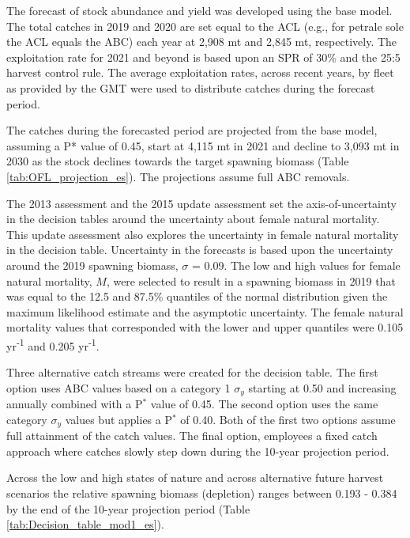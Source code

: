 \documentclass[12pt,]{article}
\begin{document}
The forecast of stock abundance and yield was developed using the base
model. The total catches in 2019 and 2020 are set equal to the ACL
(e.g., for petrale sole the ACL equals the ABC) each year at 2,908 mt
and 2,845 mt, respectively. The exploitation rate for 2021 and beyond is
based upon an SPR of 30\% and the 25:5 harvest control rule. The average
exploitation rates, across recent years, by fleet as provided by the GMT
were used to distribute catches during the forecast period.

The catches during the forecasted period are projected from the base
model, assuming a P* value of 0.45, start at 4,115 mt in 2021 and
decline to 3,093 mt in 2030 as the stock declines towards the target
spawning biomass (Table \ref{tab:OFL_projection_es}). The projections
assume full ABC removals.

The 2013 assessment and the 2015 update assessment set the
axis-of-uncertainty in the decision tables around the uncertainty about
female natural mortality. This update assessment also explores the
uncertainty in female natural mortality in the decision table.
Uncertainty in the forecasts is based upon the uncertainty around the
2019 spawning biomass, \(\sigma\) = 0.09. The low and high values for
female natural mortality, \(M\), were selected to result in a spawning
biomass in 2019 that was equal to the 12.5 and 87.5\% quantiles of the
normal distribution given the maximum likelihood estimate and the
asymptotic uncertainty. The female natural mortality values that
corresponded with the lower and upper quantiles were 0.105
yr\textsuperscript{-1} and 0.205 yr\textsuperscript{-1}.

Three alternative catch streams were created for the decision table. The
first option uses ABC values based on a category 1 \(\sigma_y\) starting
at 0.50 and increasing annually combined with a P\(^*\) value of 0.45.
The second option uses the same category \(\sigma_y\) values but applies
a P\(^*\) of 0.40. Both of the first two options assume full attainment
of the catch values. The final option, employees a fixed catch approach
where catches slowly step down during the 10-year projection period.

Across the low and high states of nature and across alternative future
harvest scenarios the relative spawning biomass (depletion) ranges
between 0.193 - 0.384 by the end of the 10-year projection period (Table
\ref{tab:Decision_table_mod1_es}).
\end{document}
